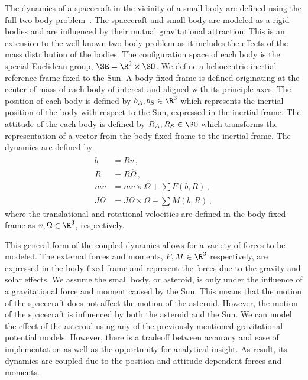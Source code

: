 \documentclass[11pt]{article} %
\begin{document}
The dynamics of a spacecraft in the vicinity of a small body are defined using the full two-body problem~\cite{fahnestock2006}.
The spacecraft and small body are modeled as a rigid bodies and are influenced by their mutual gravitational attraction.
This is an extension to the well known two-body problem as it includes the effects of the mass distribution of the bodies.
The configuration space of each body is the special Euclidean group, \( \SE = \R^3 \times \SO \). 
We define a heliocentric inertial reference frame fixed to the Sun. 
A body fixed frame is defined originating at the center of mass of each body of interest and aligned with its principle axes.
The position of each body is defined by \( b_A, b_S \in \R^3 \) which represents the inertial position of the body with respect to the Sun, expressed in the inertial frame. 
The attitude of the each body is defined by \( R_A, R_S \in \SO\) which transforms the representation of a vector from the body-fixed frame to the inertial frame.
The dynamics are defined by
\begin{align*}
	\dot{b} &= R v \, ,\\
	\dot{R} &= R \hat{\Omega} \, ,\\
	m \dot{v} &= m v \times \Omega + \sum F(b, R) \, ,\\
	J \dot{\Omega}  &= J \Omega \times \Omega +  \sum M(b, R) \, ,
\end{align*}
where the translational and rotational velocities are defined in the body fixed frame as \( v , \Omega \in \R^3 \), respectively.

This general form of the coupled dynamics allows for a variety of forces to be modeled.
The external forces and moments, \( F, M \in \R^3 \) respectively, are expressed in the body fixed frame and represent the forces due to the gravity and solar effects.
We assume the small body, or asteroid, is only under the influence of a gravitational force and moment caused by the Sun.
This means that the motion of the spacecraft does not affect the motion of the asteroid. 
However, the motion of the spacecraft is influenced by both the asteroid and the Sun.
We can model the effect of the asteroid using any of the previously mentioned gravitational potential models. 
However, there is a tradeoff between accuracy and ease of implementation as well as the opportunity for analytical insight. 
As result, its dynamics are coupled due to the position and attitude dependent forces and moments.
\end{document}
